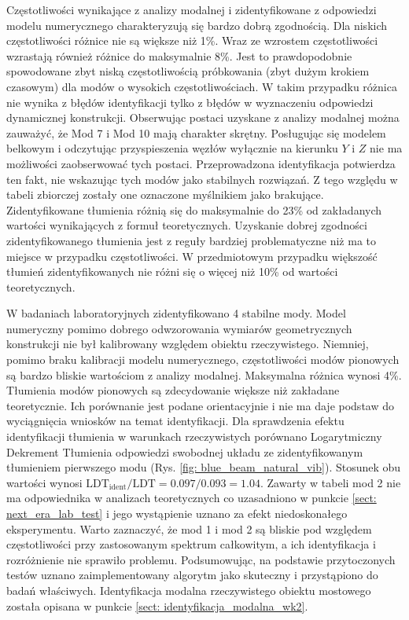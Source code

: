 Częstotliwości wynikające z analizy modalnej i zidentyfikowane z odpowiedzi modelu numerycznego charakteryzują się bardzo dobrą zgodnością. Dla niskich częstotliwości różnice nie są większe niż 1\%. Wraz ze wzrostem częstotliwości wzrastają również różnice do maksymalnie 8\%. Jest to prawdopodobnie spowodowane zbyt niską częstotliwością próbkowania (zbyt dużym krokiem czasowym) dla modów o wysokich częstotliwościach. W takim przypadku różnica nie wynika z błędów identyfikacji tylko z błędów w wyznaczeniu odpowiedzi dynamicznej konstrukcji. Obserwując postaci uzyskane z analizy modalnej można zauważyć, że Mod 7 i Mod 10 mają charakter skrętny. Posługując się modelem belkowym i odczytując przyspieszenia węzłów wyłącznie na kierunku $Y$ i $Z$ nie ma możliwości zaobserwować tych postaci. Przeprowadzona identyfikacja potwierdza ten fakt, nie wskazując tych modów jako stabilnych rozwiązań. Z tego względu w tabeli zbiorczej zostały one oznaczone myślnikiem jako brakujące. Zidentyfikowane tłumienia różnią się do maksymalnie do 23\% od zakładanych wartości wynikających z formuł teoretycznych. Uzyskanie dobrej zgodności zidentyfikowanego tłumienia jest z reguły bardziej problematyczne niż ma to miejsce w przypadku częstotliwości. W przedmiotowym przypadku większość tłumień zidentyfikowanych nie różni się o więcej niż 10\% od wartości teoretycznych.

W badaniach laboratoryjnych zidentyfikowano 4 stabilne mody. Model numeryczny pomimo dobrego odwzorowania wymiarów geometrycznych konstrukcji nie był kalibrowany względem obiektu rzeczywistego. Niemniej, pomimo braku kalibracji modelu numerycznego, częstotliwości modów pionowych są bardzo bliskie wartościom z analizy modalnej. Maksymalna różnica wynosi 4\%. Tłumienia modów pionowych są zdecydowanie większe niż zakładane teoretycznie. Ich porównanie jest podane orientacyjnie i nie ma daje podstaw do wyciągnięcia wniosków na temat identyfikacji. Dla sprawdzenia efektu identyfikacji tłumienia w warunkach rzeczywistych porównano Logarytmiczny Dekrement Tłumienia odpowiedzi swobodnej układu ze zidentyfikowanym tłumieniem pierwszego modu (Rys. \ref{fig: blue_beam_natural_vib}). Stosunek obu wartości wynosi $\text{LDT}_{\text{ident}}/\text{LDT} = 0.097/0.093=1.04$. Zawarty w tabeli mod 2 nie ma odpowiednika w analizach teoretycznych co uzasadniono w punkcie \ref{sect: next_era_lab_test} i jego wystąpienie uznano za efekt niedoskonałego eksperymentu. Warto zaznaczyć, że mod 1 i mod 2 są bliskie pod względem częstotliwości przy zastosowanym spektrum całkowitym, a ich identyfikacja i rozróżnienie nie sprawiło problemu.
Podsumowując, na podstawie przytoczonych testów uznano zaimplementowany algorytm jako skuteczny i przystąpiono do badań właściwych. Identyfikacja modalna rzeczywistego obiektu mostowego została opisana w punkcie \ref{sect: identyfikacja_modalna_wk2}.

